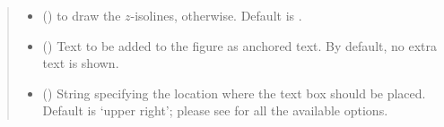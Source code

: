 \documentclass[letterpaper,10pt,english]{sphinxmanual}
\begin{document}
\begin{fulllineitems}
\begin{quote}
\begin{description}
\begin{itemize}
\item {} 
 () \textendash{}  to draw the \(z\)-isolines,  otherwise. Default is .

\item {} 
 () \textendash{} Text to be added to the figure as anchored text. By default, no extra text is shown.

\item {} 
 () \textendash{} String specifying the location where the text box should be placed. Default is ‘upper right’;
please see  for all the available options.

\end{itemize}

\end{description}\end{quote}

\end{fulllineitems}

\end{document}
